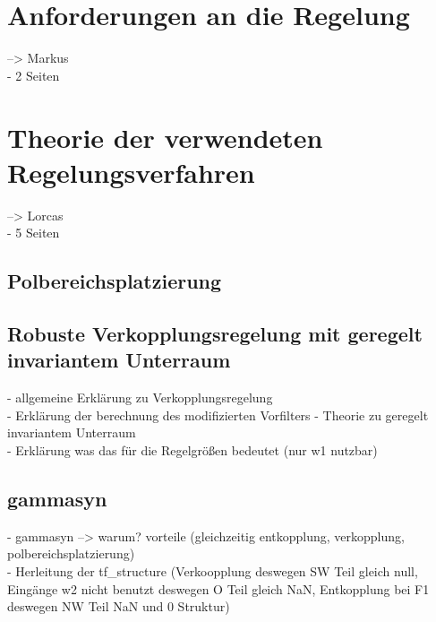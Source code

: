 \section{Anforderungen an die Regelung}
--> Markus\\
- 2 Seiten\\
\section{Theorie der verwendeten Regelungsverfahren}
--> Lorcas\\
- 5 Seiten\\
\subsection{Polbereichsplatzierung}
\subsection{Robuste Verkopplungsregelung mit geregelt invariantem Unterraum}
- allgemeine Erklärung zu Verkopplungsregelung\\
- Erklärung der berechnung des modifizierten Vorfilters
- Theorie zu geregelt invariantem Unterraum \\
- Erklärung was das für die Regelgrößen bedeutet (nur w1 nutzbar)\\
\subsection{gammasyn}
- gammasyn --> warum? vorteile (gleichzeitig entkopplung, verkopplung, polbereichsplatzierung)\\
- Herleitung der tf\_structure (Verkoopplung deswegen SW Teil gleich null, Eingänge w2 nicht benutzt deswegen O Teil gleich NaN, Entkopplung bei F1 deswegen NW Teil NaN und 0 Struktur)\\

